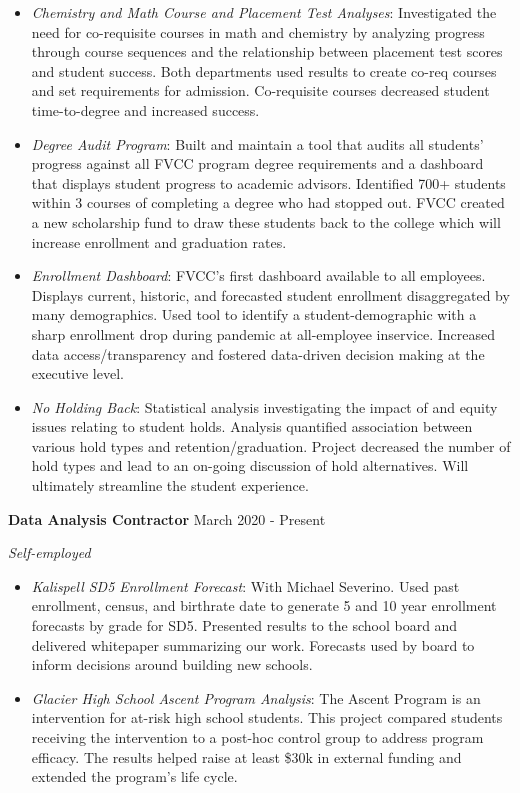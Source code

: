 \documentclass[12pt]{article}
\begin{document}
\begin{itemize}

\item \textit{Chemistry and Math Course and Placement Test Analyses}: Investigated the need for co-requisite courses in math and chemistry by analyzing progress through course sequences and the relationship between placement test scores and student success. Both departments used results to create co-req courses and set requirements for admission. Co-requisite courses decreased student time-to-degree and increased success.

\item \textit{Degree Audit Program}: Built and maintain a tool that audits all students' progress against all FVCC program degree requirements and a dashboard that displays student progress to academic advisors. Identified 700+ students within 3 courses of completing a degree who had stopped out. FVCC created a new scholarship fund to draw these students back to the college which will increase enrollment and graduation rates.

\item \textit{Enrollment Dashboard}: FVCC's first dashboard available to all employees. Displays current, historic, and forecasted student enrollment disaggregated by many demographics. Used tool to identify a student-demographic with a sharp enrollment drop during pandemic at all-employee inservice.   Increased data access/transparency and fostered data-driven decision making at the executive level. 

\item \textit{No Holding Back}: Statistical analysis investigating the impact of and equity issues relating to student holds. Analysis quantified association between various hold types and retention/graduation. Project decreased the number of hold types and lead to an on-going discussion of hold alternatives. Will ultimately streamline the student experience.

\end{itemize} 


\noindent \textbf{Data Analysis Contractor} \hfill  March 2020 - Present

\textit{Self-employed} 

\begin{itemize}
\item \textit{Kalispell SD5 Enrollment Forecast}: With Michael Severino. Used past enrollment, census, and birthrate date to generate 5 and 10 year enrollment forecasts by grade for SD5. Presented results to the school board and delivered whitepaper summarizing our work. Forecasts used by board to inform decisions around building new schools. 

\item \textit{Glacier High School Ascent Program Analysis}: The Ascent Program is an intervention for at-risk high school students.  This project compared students receiving the intervention to a post-hoc control group  to address program efficacy. 
The results helped raise at least \$30k in external funding and extended  the program's life cycle.
\end{itemize}
\end{document}
